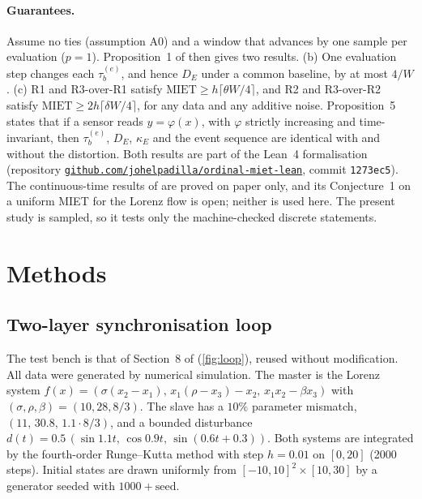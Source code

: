 \documentclass[10pt,a4paper]{article}
\newcommand{\te}{\tau_b^{(e)}}
\newcommand{\MIET}{\mathrm{MIET}}
\newcommand{\R}[1]{\textup{R#1}}
\begin{document}
\paragraph{Guarantees.} Assume no ties (assumption A0) and a window that advances by one sample per evaluation ($p=1$). Proposition~1 of \citep{pv2026miet} then gives two results. (b) One evaluation step changes each $\te$, and hence $D_E$ under a common baseline, by at most $4/W$. (c) \R{1} and \R{3}-over-\R{1} satisfy $\MIET\ge h\lceil\theta W/4\rceil$, and \R{2} and \R{3}-over-\R{2} satisfy $\MIET\ge 2h\lceil\delta W/4\rceil$, for any data and any additive noise. Proposition~5 states that if a sensor reads $y=\varphi(x)$, with $\varphi$ strictly increasing and time-invariant, then $\te$, $D_E$, $\kappa_E$ and the event sequence are identical with and without the distortion. Both results are part of the Lean~4 formalisation (repository \href{https://github.com/johelpadilla/ordinal-miet-lean}{\nolinkurl{github.com/johelpadilla/ordinal-miet-lean}}, commit \texttt{1273ec5}). The continuous-time results of \citep{pv2026miet} are proved on paper only, and its Conjecture~1 on a uniform MIET for the Lorenz flow is open; neither is used here. The present study is sampled, so it tests only the machine-checked discrete statements.

\section{Methods}\label{sec:methods}

\subsection{Two-layer synchronisation loop}\label{sec:loop}


The test bench is that of Section~8 of \citep{pv2026miet} (\cref{fig:loop}), reused without modification. All data were generated by numerical simulation. The master is the Lorenz system \citep{lorenz1963} $f(x)=(\sigma(x_2-x_1),\,x_1(\rho-x_3)-x_2,\,x_1x_2-\beta x_3)$ with $(\sigma,\rho,\beta)=(10,28,8/3)$. The slave has a $10\%$ parameter mismatch, $(11,\,30.8,\,1.1\cdot8/3)$, and a bounded disturbance $d(t)=0.5\,(\sin1.1t,\,\cos0.9t,\,\sin(0.6t+0.3))$. Both systems are integrated by the fourth-order Runge--Kutta method with step $h=0.01$ on $[0,20]$ (2000 steps). Initial states are drawn uniformly from $[-10,10]^2\times[10,30]$ by a generator seeded with $1000+\text{seed}$.
\end{document}
